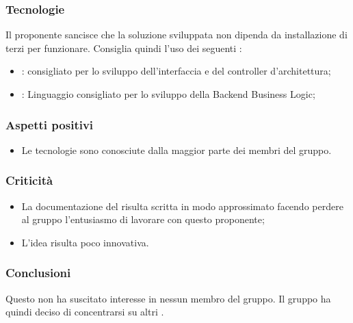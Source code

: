 \documentclass[]{article}
\begin{document}
		\subsubsection{Tecnologie}
		Il proponente sancisce che la soluzione sviluppata non dipenda da installazione di  terzi per funzionare.
		Consiglia quindi l'uso dei seguenti : 
		\begin{itemize}
			\item \textsc{}:  consigliato per lo sviluppo dell'interfaccia e del controller d'architettura;
			\item \textsc{}: Linguaggio consigliato per lo sviluppo della Backend Business Logic;
			
		\end{itemize}
		
		
		\subsubsection{Aspetti positivi}
		\begin{itemize}
			\item Le tecnologie sono conosciute dalla maggior parte dei membri del gruppo.
		\end{itemize}
		
		\subsubsection{Criticità}
		\begin{itemize}
			\item La documentazione del  risulta scritta in modo approssimato facendo perdere al gruppo l'entusiasmo di lavorare con questo proponente;
			\item L'idea risulta poco innovativa.
		\end{itemize}
		
		\subsubsection{Conclusioni}
		Questo  non ha suscitato interesse in nessun membro del gruppo. Il gruppo ha quindi deciso di  concentrarsi su altri . 
		
		\newpage
\end{document}
